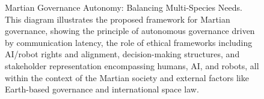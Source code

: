 \documentclass[fontsize=10pt, oneside, DIV=calc]{scrartcl}
\begin{document}
\begin{figure}[H]
  \centering
  \noindent
  \begin{minipage}{\textwidth}
    \centering
    \caption{Martian Governance Autonomy: Balancing Multi-Species Needs. This diagram illustrates the proposed framework for Martian governance, showing the principle of autonomous governance driven by communication latency, the role of ethical frameworks including AI/robot rights and alignment, decision-making structures, and stakeholder representation encompassing humans, AI, and robots, all within the context of the Martian society and external factors like Earth-based governance and international space law.}
  \end{minipage}
\end{figure}
\end{document}

